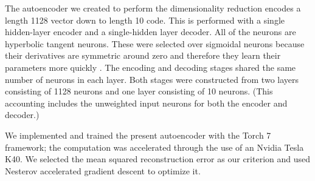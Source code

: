 The autoencoder we created to perform the dimensionality reduction encodes a
length 1128 vector down to length 10 code. This is performed with a single
hidden-layer encoder and a single-hidden layer decoder. All of the neurons are
hyperbolic tangent neurons. These were selected over sigmoidal neurons because
their derivatives are symmetric around zero and therefore they learn their
parameters more quickly \cite{sibi2013analysis}. The encoding and decoding
stages shared the same number of neurons in each layer. Both stages were
constructed from two layers consisting of 1128 neurons and one layer
consisting  of 10 neurons. (This accounting includes the unweighted input neurons for both the encoder and decoder.)

We implemented and trained the present autoencoder with the Torch 7
\cite{collobert2011torch7} framework; the computation was accelerated through
the use of an Nvidia Tesla K40. We selected the mean squared reconstruction
error as our criterion and used Nesterov accelerated gradient descent
\cite{nesterov2007gradient} to optimize it.
